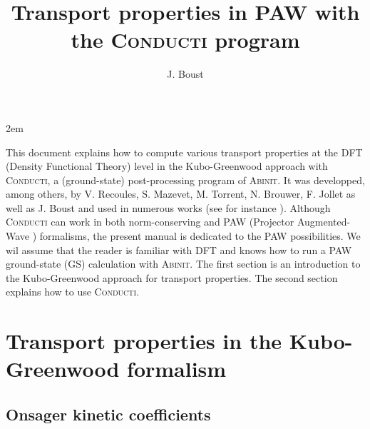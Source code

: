 \documentclass[a4,12pts]{extarticle}
\title{Transport properties in PAW with the \textsc{Conducti} program}
\author{J. Boust}
\begin{document}
\maketitle
{}%
\emergencystretch 2em%

 This document explains how to compute various transport properties at the DFT (Density Functional Theory) level in the Kubo-Greenwood approach with \textsc{Conducti}, a (ground-state) post-processing program of \textsc{Abinit}. It was developped, among others, by V. Recoules, S. Mazevet, M. Torrent, N. Brouwer, F. Jollet as well as J. Boust and used in numerous works (see for instance \cite{Mazevet2010,Jourdain2020,Brouwer2021}).
Although \textsc{Conducti} can work in both norm-conserving and PAW (Projector Augmented-Wave \cite{Bloechl1994}) formalisms, the present manual is dedicated to the PAW possibilities.
We wil assume that the reader is familiar with DFT and knows how to run a PAW ground-state (GS) calculation with \textsc{Abinit}.
The first section is an introduction to the Kubo-Greenwood approach for transport properties.
The second section explains how to use \textsc{Conducti}.



\section{Transport properties in the Kubo-Greenwood formalism}

\subsection{Onsager kinetic coefficients} \label{Onsager}
\end{document}
